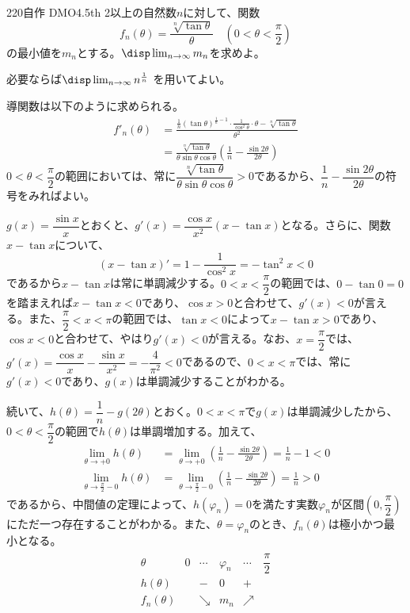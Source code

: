 \begin{thm}{220}{}{自作 DMO4.5th}
 2以上の自然数$n$に対して、関数
 \[ f_n(\theta)=\frac{\sqrt[n]{\tan\theta}}{\theta} \quad (0<\theta<\frac{\pi}{2}) \]
 の最小値を$m_n$とする。$\disp \lim_{n\to\infty} m_n$を求めよ。

 必要ならば$\disp \lim_{n\to\infty} n^{\frac{1}{n}}$ を用いてよい。
\end{thm}

導関数は以下のように求められる。
\begin{align*}
 f'_n(\theta)&=\frac{\frac{1}{n}(\tan\theta)^{\frac{1}{n}-1}\cdot\frac{1}{\cos^2\theta}\cdot\theta-\sqrt[n]{\tan\theta}}{\theta^2} \\
 &=\frac{\sqrt[n]{\tan\theta}}{\theta\sin\theta\cos\theta}\left(\frac{1}{n}-\frac{\sin 2\theta}{2\theta}\right)
\end{align*}
$0<\theta<\dfrac{\pi}{2}$の範囲においては、常に$\dfrac{\sqrt[n]{\tan\theta}}{\theta\sin\theta\cos\theta}>0$であるから、$\dfrac{1}{n}-\dfrac{\sin 2\theta}{2\theta}$の符号をみればよい。

$g(x)=\dfrac{\sin x}{x}$とおくと、$g'(x)=\dfrac{\cos x}{x^2}(x-\tan x)$となる。さらに、関数$x-\tan x$について、
\[ (x-\tan x)'=1-\frac{1}{\cos^2 x}=-\tan^2 x < 0 \]
であるから$x-\tan x$は常に単調減少する。$0<x<\dfrac{\pi}{2}$の範囲では、$0-\tan 0=0$を踏まえれば$x-\tan x<0$であり、$\cos x>0$と合わせて、$g'(x)<0$が言える。また、$\dfrac{\pi}{2}<x<\pi$の範囲では、$\tan x<0$によって$x-\tan x>0$であり、$\cos x<0$と合わせて、やはり$g'(x)<0$が言える。なお、$x=\dfrac{\pi}{2}$では、$g'(x)=\dfrac{\cos x}{x}-\dfrac{\sin x}{x^2}=-\dfrac{4}{\pi^2}<0$であるので、$0<x<\pi$では、常に$g'(x)<0$であり、$g(x)$は単調減少することがわかる。

続いて、$h(\theta)=\dfrac{1}{n}-g(2\theta)$とおく。$0<x<\pi$で$g(x)$は単調減少したから、$0<\theta<\dfrac{\pi}{2}$の範囲で$h(\theta)$は単調増加する。加えて、
\begin{align*}
 \lim_{\theta\to +0} h(\theta)&=\lim_{\theta\to +0} \left(\frac{1}{n}-\frac{\sin 2\theta}{2\theta}\right)=\frac{1}{n}-1 < 0 \\
 \lim_{\theta\to \frac{\pi}{2}-0}h(\theta)&=\lim_{\theta\to \frac{\pi}{2}-0} \left(\frac{1}{n}-\frac{\sin 2\theta}{2\theta}\right)=\frac{1}{n}>0
\end{align*}
であるから、中間値の定理によって、$h(\varphi_n)=0$を満たす実数$\varphi_n$が区間$\left(0, \dfrac{\pi}{2}\right)$にただ一つ存在することがわかる。また、$\theta=\varphi_n$のとき、$f_n(\theta)$は極小かつ最小となる。
\begin{align*}
 \begin{array}{c|c|c|c|c|c}
  \theta & 0 & \cdots & \varphi_n & \cdots & \dfrac{\pi}{2} \\[1.0ex] \hline
  h(\theta) & & - & 0 & + & \\[1.0ex] \hline
  f_n(\theta) & & \searrow & m_n & \nearrow & \\
 \end{array}
\end{align*}

